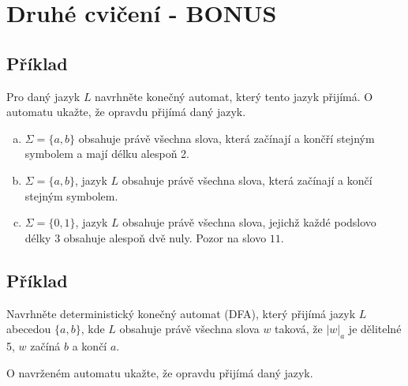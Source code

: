 \section{Druhé cvičení - BONUS}

\subsection{Příklad}
Pro daný jazyk $L$ navrhněte konečný automat, který tento jazyk přijímá. O automatu ukažte, že opravdu přijímá daný jazyk.
\begin{enumerate}[a), noitemsep]
    \item $\Sigma = \{a,b\}$ obsahuje právě všechna slova, která začínají a končří stejným symbolem a mají délku alespoň 2.
    \item $\Sigma = \{a,b\}$, jazyk $L$ obsahuje právě všechna slova, která začínají a končí stejným symbolem.
    \item $\Sigma = \{0,1\}$, jazyk $L$ obsahuje právě všechna slova, jejichž každé podslovo délky 3 obsahuje alespoň
    dvě nuly. Pozor na slovo $11$. 
\end{enumerate}

\subsection{Příklad}
Navrhněte deterministický konečný automat (DFA), který přijímá jazyk $L$ abecedou $\{a,b\}$, kde $L$ obsahuje právě
všechna slova $w$ taková, že $|w|_a$ je dělitelné 5, $w$ začíná $b$ a končí $a$.

\noindent
O navrženém automatu ukažte, že opravdu přijímá daný jazyk.